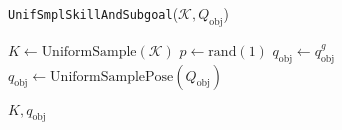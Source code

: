 \begin{algorithm}[H]
\caption{\texttt{UnifSmplSkillAndSubgoal}($\mathcal{K}, Q_{\text{obj}}$)}\label{algo:UnifSmplSkillAndSubgoal}
\begin{algorithmic}[1]

\State $K \gets \text{UniformSample}(\mathcal{K})$
\State $p \leftarrow \text{rand}(1)$ 
    \State $q_{\text{obj}} \gets q^{g}_\text{obj}$
\Else
    \State $q_{\text{obj}} \gets \text{UniformSamplePose}(Q_{\text{obj}})$
\EndIf

\State \Return $K, q_{\text{obj}}$

\end{algorithmic}
\end{algorithm}
